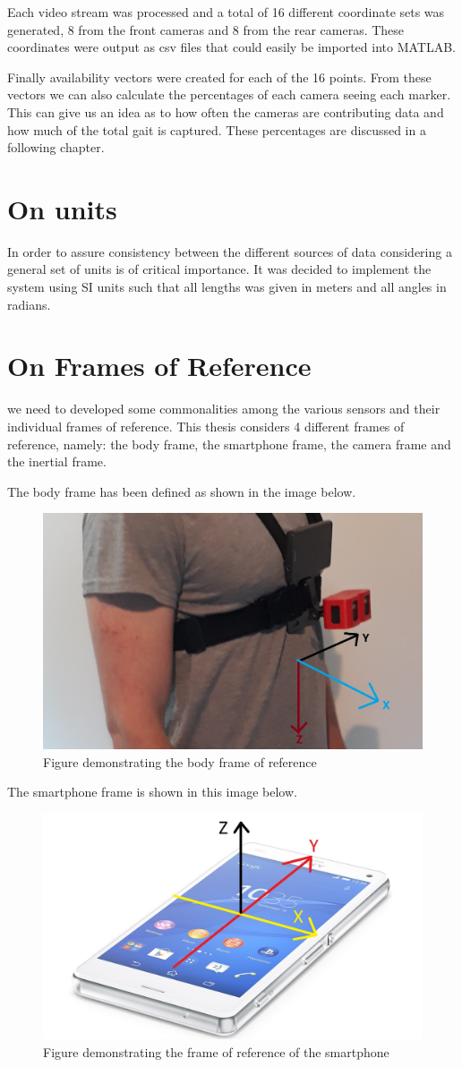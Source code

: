 Each video stream was processed and a total of 16 different coordinate sets was generated, 8 from the front cameras and 8 from the rear cameras. These coordinates were output as csv files that could easily be imported into MATLAB.


Finally availability vectors were created for each of the 16 points. 
From these vectors we can also calculate the percentages of each camera seeing each marker. This can give us an idea as to how often the cameras are contributing data and how much of the total gait is captured. These percentages are discussed in a following chapter.

\section*{On units}
In order to assure consistency between the different sources of data considering a general set of units is of critical importance. It was decided to implement the system using SI units such that all lengths was given in meters and all angles in radians.

\section*{On Frames of Reference}
we need to developed some commonalities among the various sensors and their individual frames of reference. This thesis considers 4 different frames of reference, namely: the body frame, the smartphone frame, the camera frame and the inertial frame.

The body frame has been defined as shown in the image below.

\begin{figure}[!ht] 
\captionsetup{width=0.8\linewidth, font=small}  
\includegraphics[width=0.5\linewidth]{figures/patbf.jpg}
\caption{Figure demonstrating the body frame of reference}
\label{fig:patbf}
\end{figure}

The smartphone frame is shown in this image below.

\begin{figure}[!ht] 
\captionsetup{width=0.8\linewidth, font=small}  
\includegraphics[width=0.5\linewidth]{figures/phone.jpg}
\caption{Figure demonstrating the frame of reference of the smartphone}
\label{fig:phone}
\end{figure}

